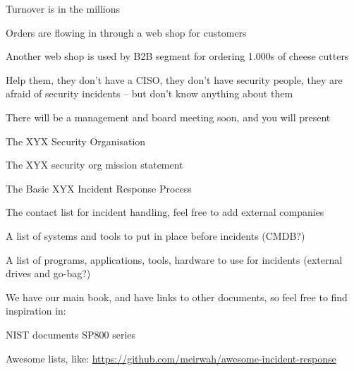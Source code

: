 \documentclass[Screen16to9,17pt]{foils}
\begin{document}
\begin{list2}
\item Turnover is in the millions
\item Orders are flowing in through a web shop for customers
\item Another web shop is used by B2B segment for ordering 1.000s of cheese cutters
\end{list2}

Help them, they don't have a CISO, they don't have security people, they are afraid of security incidents -- but don't know anything about them




There will be a management and board meeting soon, and you will present

\begin{list2}
\item The XYX Security Organisation
\item The XYX security org mission statement
\item The Basic XYX Incident Response Process
\item The contact list for incident handling, feel free to add external companies
\item A list of systems and tools to put in place before incidents (CMDB?)
\item A list of programs, applications, tools, hardware to use for incidents (external drives and go-bag?)
\end{list2}



We have our main book, and have links to other documents, so feel free to find inspiration in:

\begin{list2}
\item NIST documents SP800 series
\item Awesome lists, like: \url{https://github.com/meirwah/awesome-incident-response}
\end{list2}





\end{document}
